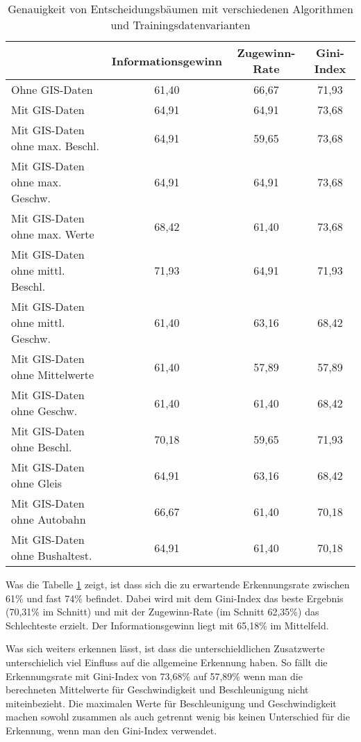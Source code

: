 \begin{table}[h]
\centering
\begin{tabular}{|l|c|c|c|}
\hline
 & {\bf Informationsgewinn} & {\bf Zugewinn-Rate} & {\bf Gini-Index} \\ \hline
Ohne GIS-Daten & 61,40 & 66,67 & 71,93 \\ \hline
Mit GIS-Daten & 64,91 & 64,91 & 73,68 \\ \hline
Mit GIS-Daten ohne max. Beschl. & 64,91 & 59,65 & 73,68 \\ \hline
Mit GIS-Daten ohne max. Geschw. & 64,91 & 64,91 & 73,68 \\ \hline
Mit GIS-Daten ohne max. Werte & 68,42 & 61,40 & 73,68 \\ \hline
Mit GIS-Daten ohne mittl. Beschl. & 71,93 & 64,91 & 71,93 \\ \hline
Mit GIS-Daten ohne mittl. Geschw. & 61,40 & 63,16 & 68,42 \\ \hline
Mit GIS-Daten ohne Mittelwerte & 61,40 & 57,89 & 57,89 \\ \hline
Mit GIS-Daten ohne Geschw. & 61,40 & 61,40 & 68,42 \\ \hline
Mit GIS-Daten ohne Beschl. & 70,18 & 59,65 & 71,93 \\ \hline
Mit GIS-Daten ohne Gleis & 64,91 & 63,16 & 68,42 \\ \hline
Mit GIS-Daten ohne Autobahn & 66,67 & 61,40 & 70,18 \\ \hline
Mit GIS-Daten ohne Bushaltest. & 64,91 & 61,40 & 70,18 \\ \hline
\end{tabular}
\caption{Genauigkeit von Entscheidungsbäumen mit verschiedenen Algorithmen und Trainingsdatenvarianten}
\label{dt-calculation-methods}
\end{table}

Was die Tabelle \ref{dt-calculation-methods} zeigt, ist dass sich die zu erwartende Erkennungsrate zwischen 61\% und fast 74\% befindet. Dabei wird mit dem Gini-Index das beste Ergebnis (70,31\% im Schnitt) und mit der Zugewinn-Rate (im Schnitt 62,35\%) das Schlechteste erzielt. Der Informationsgewinn liegt mit 65,18\% im Mittelfeld.

Was sich weiters erkennen lässt, ist dass die unterschieldlichen Zusatzwerte unterschielich viel Einfluss auf die allgemeine Erkennung haben. So fällt die Erkennungsrate mit Gini-Index von 73,68\% auf 57,89\% wenn man die berechneten Mittelwerte für Geschwindigkeit und Beschleunigung nicht miteinbezieht. Die maximalen Werte für Beschleunigung und Geschwindigkeit machen sowohl zusammen als auch getrennt wenig bis keinen Unterschied für die Erkennung,  wenn man den Gini-Index verwendet. 

